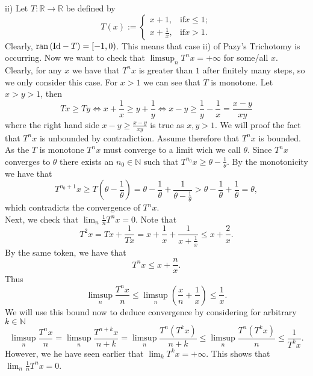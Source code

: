 \documentclass{scrartcl}
\newcommand{\N}{\mathbb{N}}
\newcommand{\R}{\mathbb{R}}
\theoremstyle{plain}
\theoremstyle{remark}
\newcommand{\Id}{\textup{Id}}
\newcommand{\ran}{\textup{ran}\,}
\begin{document}
ii) Let $T: \R \to \R$  be defined by
\begin{equation}
  T(x) := 
  \begin{cases}
    x+1, & \text{if} x\le1; \\
    x+\frac{1}{x}, & \text{if} x > 1.
  \end{cases}
\end{equation}
Clearly, $\ran(\Id - T) = [-1, 0)$.
This means that case ii) of Pazy's Trichotomy is occurring. 
Now we want to check that $\limsup_n T^n x = +\infty$ for some/all $x$. \\
Clearly, for any $x$ we have that $T^n x$ is greater than $1$ after finitely many steps, so we only consider this case.
For $x>1$ we can see that $T$ is monotone. Let $x>y > 1$, then
\begin{equation}
  Tx \ge Ty \Leftrightarrow x + \frac{1}{x} \ge y + \frac{1}{y} \Leftrightarrow x-y \ge \frac{1}{y} - \frac{1}{x} = \frac{x-y}{xy}
\end{equation}
where the right hand side $x-y \ge \frac{x-y}{xy}$ is true as $x,y > 1$.
We will proof the fact that $T^n x$ is unbounded by contradiction.
Assume therefore that $T^n x$ is bounded.
As the $T$ is monotone $T^n x$ must converge to a limit wich we call $\theta$.
Since $T^n x$ converges to $\theta$ there exists an $n_0 \in \N$ such that $T^{n_0}x \ge \theta - \frac{1}{\theta}$.
By the monotonicity we have that
\begin{equation}
  T^{n_0+1}x \ge T\left(\theta - \frac{1}{\theta}\right) = \theta - \frac{1}{\theta} + \frac{1}{\theta - \frac{1}{\theta}} > \theta - \frac{1}{\theta} + \frac{1}{\theta} = \theta,
\end{equation}
which contradicts the convergence of $T^n x$.\\
Next, we check that $\lim_{n} \frac{1}{n}T^{n}x = 0$.
Note that
\begin{equation}
  T^2 x  = Tx + \frac{1}{Tx} = x + \frac{1}{x} + \frac{1}{x+\frac{1}{x}} \le x + \frac{2}{x}.
\end{equation}
By the same token, we have that
\begin{equation}
  T^{n}x \le x + \frac{n}{x}.
\end{equation}
Thus
\begin{equation}
  \limsup_n \frac{T^{n}x}{n} \le \limsup_n \left( \frac{x}{n} + \frac{1}{x} \right) \le \frac{1}{x}.
\end{equation}
We will use this bound now to deduce convergence by considering for arbitrary $k \in \N$
\begin{equation}
  \limsup_n \frac{T^{n}x}{n} = \limsup_n \frac{T^{n+k}x}{n+k} = \limsup_n \frac{T^{n}(T^{k}x)}{n+k} \le \limsup_n \frac{T^{n}(T^{k}x)}{n} \le \frac{1}{T^{k}x}.
\end{equation}
However, we he have seen earlier that $\lim_k T^{k} x = +\infty$.
This shows that $\lim_{n} \frac{1}{n}T^{n}x = 0$.\\
\end{document}
